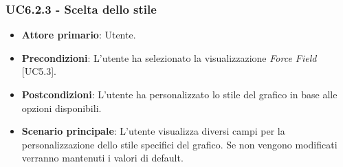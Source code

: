 \subsubsection{UC6.2.3 - Scelta dello stile}
\begin{itemize}
	\item \textbf{Attore primario}: Utente.
	\item \textbf{Precondizioni}: L'utente ha selezionato la visualizzazione \textit{Force Field} [UC5.3].
	\item \textbf{Postcondizioni}: L'utente ha personalizzato lo stile del grafico in base alle opzioni disponibili. 
	
	\item \textbf{Scenario principale}: L'utente visualizza diversi campi per la personalizzazione dello stile specifici del grafico. Se non vengono modificati verranno mantenuti i valori di default. 
\end{itemize}